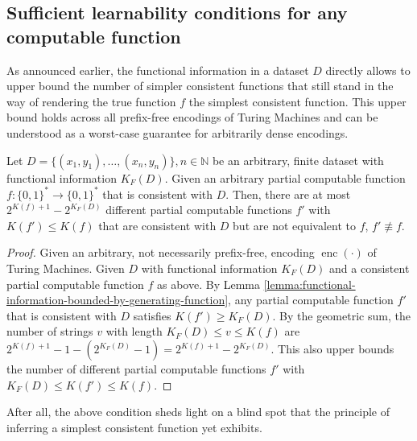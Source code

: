 \subsection{Sufficient learnability conditions for any computable function}
As announced earlier, the functional information in a dataset $D$ directly allows to upper bound the number of simpler consistent functions that still stand in the way of rendering the true function $f$ the simplest consistent function. 
This upper bound holds across all prefix-free encodings of Turing Machines and can be understood as a worst-case guarantee for arbitrarily dense encodings.

\begin{theorem}
	\label{theorem:max-alternative-simpler-consistent-functions}
	Let $D=\{(x_1,y_1),\dots,(x_n,y_n)\},n\in\mathbb{N}$ be an arbitrary, finite dataset with functional information $K_{F}(D)$.
	Given an arbitrary partial computable function $f:\{0,1\}^{*}\to\{0,1\}^{*}$ that is consistent with $D$.
	Then, there are at most $2^{K(f)+1} - 2^{K_{F}(D)}$ different partial computable functions $f'$ with $K(f')\leq K(f)$ that are consistent with $D$ but are not equivalent to $f$, $f'\not\equiv f$.
\end{theorem}
\begin{proof}
	Given an arbitrary, not necessarily prefix-free, encoding $\operatorname{enc}(\cdot)$ of Turing Machines.
	Given $D$ with functional information $K_F(D)$ and a consistent partial computable function $f$ as above.
	By Lemma \ref{lemma:functional-information-bounded-by-generating-function}, any partial computable function $f'$ that is consistent with $D$ satisfies $K(f') \geq K_F(D)$.
	By the geometric sum, the number of strings $v$ with length $K_F(D)\leq v \leq K(f)$ are 
	$2^{K(f)+1} -1 - (2^{K_{F}(D)}-1)=2^{K(f)+1}-2^{K_{F}(D)}$.
	This also upper bounds the number of different partial computable functions $f'$ with $K_F(D)\leq K(f')\leq K(f)$.
\end{proof}
After all, the above condition sheds light on a blind spot that the principle of inferring a simplest consistent function yet exhibits.


